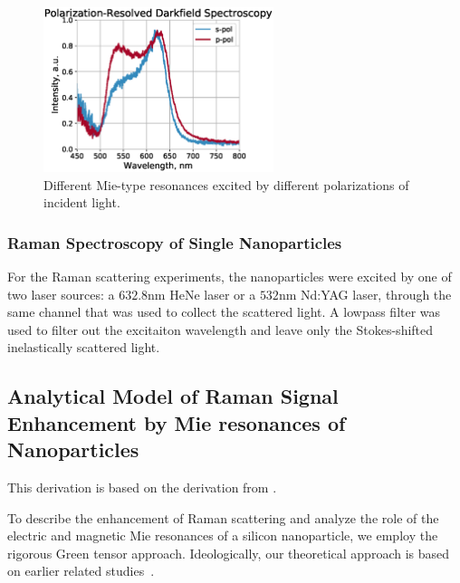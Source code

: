             \begin{figure}[!ht]
                    \begin{center}
                        \includegraphics[width=0.6\textwidth]{figs/methods/DF/id_52780.eps}
                    \end{center}
                    \caption{Different Mie-type resonances excited by different polarizations of incident light.}
                    \label{fig:PolarizedDF}
            \end{figure}

        \subsubsection{Raman Spectroscopy of Single Nanoparticles}
        \label{sec:Raman}
                For the Raman scattering experiments, the nanoparticles were excited by one of two laser sources: a $632.8$nm HeNe laser
            or a $532$nm Nd:YAG laser, through the same channel that was used to collect the scattered light. A lowpass filter was used
            to filter out the excitaiton wavelength and leave only the Stokes-shifted inelastically scattered light.

    \subsection{Analytical Model of Raman Signal Enhancement by Mie resonances of Nanoparticles}
        \label{sec:Theory}
            This derivation is based on the derivation from \cite{dmitriev2016resonant}.

            To describe the enhancement of Raman scattering and analyze the role of the electric and magnetic
        Mie resonances of a silicon nanoparticle, we employ the rigorous Green tensor approach. Ideologically,
        our theoretical approach is based on earlier related studies~\cite{canccado2014theory, murphy1983enhanced}.

